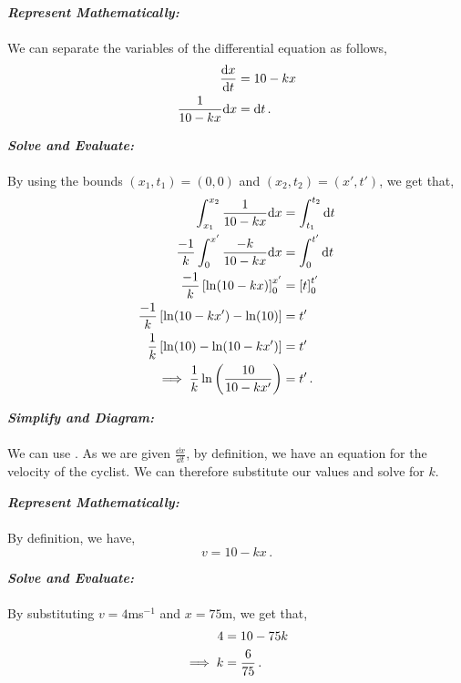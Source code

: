 \begin{subquestions}
\begin{subsubquestions}
\textbf{\textit{Represent Mathematically:}} \\ \\
We can separate the variables of the differential equation as follows,
\begin{align}
	\frac{\mathrm{d}x}{\mathrm{d}t} & = 10-kx \nonumber \\
	\frac{1}{10-kx}\mathrm{d} x & = \mathrm{d} t \,.
\end{align}




\textbf{\textit{Solve and Evaluate:}} \\ \\
By using the bounds $(x_1,t_1)=(0,0)$ and $(x_2,t_2)=(x',t')$, we get that,
\begin{align}
	\int_{x_1}^{x_2}\frac{1}{10-kx}\mathrm{d} x & = \int_{t_1}^{t_2}\mathrm{d} t \nonumber \\
	\frac{-1}{k} \int_{0}^{x'}\frac{-k}{10-kx}\mathrm{d} x & = \int_{0}^{t'}\mathrm{d} t \nonumber \\
	\frac{-1}{k} \left[\ln(10-kx)\right]_0^{x'} & = \left[t\right]_0^{t'} \nonumber \\
	\frac{-1}{k} \left[\ln(10-kx')-\ln(10)\right] & = t' \nonumber \\
	\frac{1}{k} \left[\ln(10)-\ln(10-kx')\right] & = t' \nonumber \\
	\implies \frac{1}{k} \ln\left(\frac{10}{10-kx'}\right) & = t' \,.
\end{align}


\subsubquestion

\textbf{\textit{Simplify and Diagram:}} \\ \\
We can use . As we are given $\frac{\dd x}{\dd t}$, by definition, we have an equation for the velocity of the cyclist. We can therefore substitute our values and solve for $k$.




\textbf{\textit{Represent Mathematically:}} \\ \\
By definition, we have,
\begin{equation}
	v = 10-kx \,.
\end{equation}




\textbf{\textit{Solve and Evaluate:}} \\ \\
By substituting $v=4$ms$^{-1}$ and $x=75$m, we get that,
\begin{align}
	4 & = 10-75k \nonumber \\
	\implies k & = \frac{6}{75} \,.
\end{align}

\end{subsubquestions}

\end{subquestions}